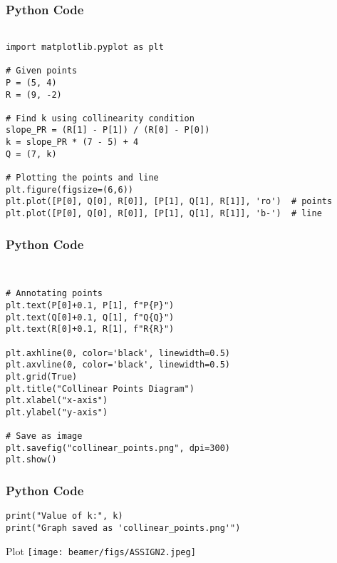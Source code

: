 \documentclass{beamer}
\begin{document}
\begin{frame}[fragile]
    \frametitle{Python Code }
    \begin{lstlisting}
    
import matplotlib.pyplot as plt

# Given points
P = (5, 4)
R = (9, -2)

# Find k using collinearity condition
slope_PR = (R[1] - P[1]) / (R[0] - P[0])
k = slope_PR * (7 - 5) + 4
Q = (7, k)

# Plotting the points and line
plt.figure(figsize=(6,6))
plt.plot([P[0], Q[0], R[0]], [P[1], Q[1], R[1]], 'ro')  # points
plt.plot([P[0], Q[0], R[0]], [P[1], Q[1], R[1]], 'b-')  # line
\end{lstlisting}
\end{frame}
\begin{frame}[fragile]
    \frametitle{Python Code }
    \begin{lstlisting}
        
   
# Annotating points
plt.text(P[0]+0.1, P[1], f"P{P}")
plt.text(Q[0]+0.1, Q[1], f"Q{Q}")
plt.text(R[0]+0.1, R[1], f"R{R}")

plt.axhline(0, color='black', linewidth=0.5)
plt.axvline(0, color='black', linewidth=0.5)
plt.grid(True)
plt.title("Collinear Points Diagram")
plt.xlabel("x-axis")
plt.ylabel("y-axis")

# Save as image
plt.savefig("collinear_points.png", dpi=300)
plt.show()
\end{lstlisting}
\end{frame}
\begin{frame}[fragile]
    \frametitle{Python Code }
    \begin{lstlisting}
print("Value of k:", k)
print("Graph saved as 'collinear_points.png'")
 \end{lstlisting}
\end{frame}


\begin{frame}{Plot}
    \centering
    \texttt{[image: beamer/figs/ASSIGN2.jpeg]}     
\end{frame}
\end{document}
